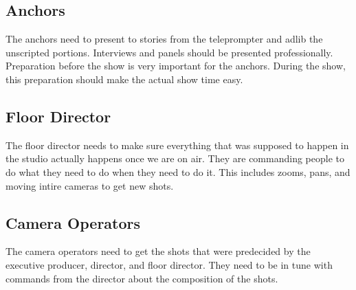 \documentclass[letterpaper,10pt,oneside]{article}
\begin{document}
\subsection{Anchors}
The anchors need to present to stories from the teleprompter and adlib the unscripted portions. Interviews and panels should be presented professionally. Preparation before the show is very important for the anchors. During the show, this preparation should make the actual show time easy.

\subsection{Floor Director}
The floor director needs to make sure everything that was supposed to happen in the studio actually happens once we are on air. They are commanding people to do what they need to do when they need to do it. This includes zooms, pans, and moving intire cameras to get new shots.

\subsection{Camera Operators}
The camera operators need to get the shots that were predecided by the executive producer, director, and floor director. They need to be in tune with commands from the director about the composition of the shots.
\end{document}
